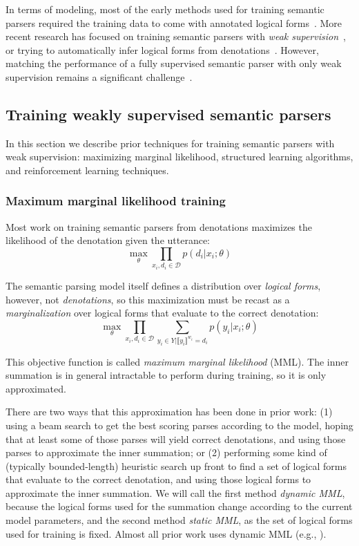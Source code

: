 In terms of modeling, most of the early methods used for training semantic
parsers required the training data to come with annotated logical
forms~\citep{zelle1996learning,Zettlemoyer2005LearningTM}. More recent research has
focused on training semantic parsers with \emph{weak 
supervision}~\citep{liang2011learning,berant2013semantic}, or trying to automatically infer
logical forms from denotations~\citep{pasupat2016inferring}. However, matching
the performance of a fully supervised semantic parser with only weak
supervision remains a significant challenge~\citep{Yih2016TheVO}.

\subsection{Training weakly supervised semantic parsers}\label{sec:prior_training}

In this section we describe prior techniques for training semantic parsers with
weak supervision: maximizing marginal likelihood, structured learning
algorithms, and reinforcement learning techniques.

\subsubsection{Maximum marginal likelihood training}\label{sec:mml}
Most work on training semantic parsers from denotations maximizes the
likelihood of the denotation given the utterance: \begin{equation} \max_\theta
\prod_{x_i,d_i \in \mathcal{D}} p(d_i|x_i; \theta) \end{equation}

\noindent The semantic parsing model itself defines a distribution over
\emph{logical forms}, however, not \emph{denotations}, so this maximization
must be recast as a \emph{marginalization} over logical forms that evaluate to
the correct denotation: \begin{equation} \max_\theta \prod_{x_i,d_i \in
\mathcal{D}} \sum_{y_i \in Y | \llbracket y_i \rrbracket^{w_i} = d_i} p(y_i |
x_i; \theta) \end{equation}

\noindent This objective function is called \emph{maximum marginal likelihood}
(MML).  The inner summation is in general intractable to perform during
training, so it is only approximated.

There are two ways that this approximation has been done in prior work: (1)
using a beam search to get the best scoring parses according to the model,
hoping that at least some of those parses will yield correct denotations, and
using those parses to approximate the inner summation; or (2) performing some
kind of (typically bounded-length) heuristic search up front to find a set of
logical forms that evaluate to the correct denotation, and using those logical
forms to approximate the inner summation.  We will call the first method
\emph{dynamic MML}, because the logical forms used for the summation change
according to the current model parameters, and the second method \emph{static
MML}, as the set of logical forms used for training is fixed.  Almost all prior
work uses dynamic MML (e.g.,
\citet{liang2011learning,berant2013semantic,goldman2017weakly}).

